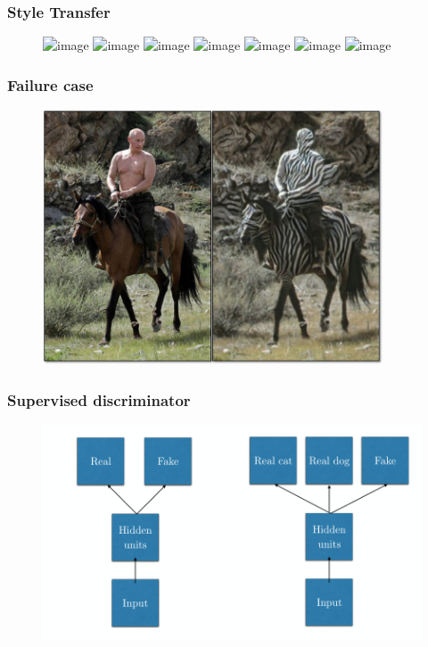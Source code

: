 \documentclass{Bredelebeamer}
\begin{document}
\begin{frame}
	\frametitle{Style Transfer}
	\begin{figure}[h!]
	\centering
	\includegraphics<1>[width=\textwidth]{cycle_gan/cg_1.png}
	\includegraphics<2>[width=\textwidth]{cycle_gan/cg_2.png}
	\includegraphics<3>[width=\textwidth]{cycle_gan/cg_3.png}
	\includegraphics<4>[width=\textwidth]{cycle_gan/cg_4.png}
	\includegraphics<5>[width=\textwidth]{cycle_gan/cg_5.png}
	\includegraphics<6>[width=\textwidth]{cycle_gan/cg_6.png}
	\includegraphics<7->[width=\textwidth]{cycle_gan/cyclegan_style_transfer.jpg}
	\end{figure}
	\pause[8]
	\href{https://www.youtube.com/watch?v=9reHvktowLY}{}
	\href{https://twitter.com/quasimondo/status/880005499084734465}{}
\end{frame}
\begin{frame}
	\frametitle{Failure case}
	\begin{figure}[h!]
	\centering
	\includegraphics[width=0.9\textwidth]{cycle_gan_failure.png}
	\end{figure}
\end{frame}
\begin{frame}
	\frametitle{Supervised discriminator}
	\begin{figure}[h!]
	\centering
	\includegraphics[width=\textwidth]{supervised_discriminator.png}
	\end{figure}
\end{frame}
\end{document}
